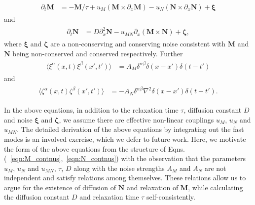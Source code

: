 \documentclass[prl,aps,twocolumn,nosuperscriptaddress,bibnotes,notitlepage,nofootinbib]{revtex4-2}
\newcommand{\magg}{\mathbf{M}}
\newcommand{\stagg}{\mathbf{N}}
\begin{document}
\begin{align}
    \begin{split}
         \partial_t \magg &= -\magg/\tau + u_M (\magg \times \partial_x \magg) - u_N (\stagg \times \partial_x \stagg) + \boldsymbol{\xi} 
         \end{split}
         \label{eqn:Mhydro}
         \end{align}
and       
\begin{align}
    \begin{split}
             \partial_t \stagg &= D\partial_x^2 \stagg - u_{MN} \partial_x (\magg \times \stagg) + \boldsymbol{\zeta},
    \end{split}
    \label{eqn:Nhydro}
\end{align}
where $\boldsymbol{\xi}$ and $\boldsymbol{\zeta}$ are a non-conserving and conserving noise consistent with $\magg$ and $\stagg$ being non-conserved and conserved respectively. Further
\begin{align}
    \begin{split}
    \langle \xi^{\alpha}(x,t) \xi^{\beta}(x',t') \rangle &= A_M \delta^{\alpha \beta} \delta(x-x') \delta(t-t')
    \end{split}
    \label{eqn:Mnoise}
\end{align}
and
\begin{align}
    \begin{split}
\langle \zeta^{\alpha}(x,t) \zeta^{\beta}(x',t') \rangle &= - A_N \delta^{\alpha \beta} \nabla^2 \delta(x-x') \delta(t-t').
    \end{split}
    \label{eqn:Nnoise}
\end{align}

In the above equations, in addition to the relaxation time $\tau$, diffusion constant $D$ and noise $\boldsymbol{\xi}$ and $\boldsymbol{\zeta}$, we assume there are effective non-linear couplings $u_M$, $u_N$ and $u_{MN}$. The detailed derivation of the above equations by integrating out the fast modes is an involved exercise, which we defer to future work. Here, we motivate the form of the above equations from the structure of Eqns.(~\ref{eqn:M_contnus},~\ref{eqn:N_contnus}) with the observation that the parameters $u_M$, $u_N$ and $u_{MN}$, $\tau$, $D$ along with the noise strengths $A_M$ and $A_N$ are not independent and satisfy relations among themselves. These relations allow us to argue for the existence of diffusion of $\stagg$ and relaxation of $\magg$, while calculating the diffusion constant $D$ and relaxation time $\tau$ self-consistently. 
\end{document}
